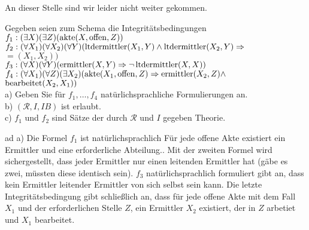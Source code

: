 \documentclass[12pt,a4paper]{amsart}
\begin{document}
An dieser Stelle sind wir leider nicht weiter gekommen.

\bigskip

\begin{aufgabe1}
Gegeben seien zum Schema die Integritätsbedingungen\\
$f_1:(\exists X)(\exists Z)(\operatorname{akte}(X,\operatorname{offen},Z))$\\
$f_2:(\forall X_1)(\forall X_2)(\forall Y)(\operatorname{ltdermittler}(X_1,Y)\land\operatorname{ltdermittler}(X_2,Y)\Rightarrow$\\ $=(X_1,X_2))$\\
$f_3:(\forall X)(\forall Y)(\operatorname{ermittler}(X,Y)\Rightarrow\lnot\operatorname{ltdermittler}(X,X))$\\
$f_4:(\forall X_1)(\forall Z)(\exists X_2)(\operatorname{akte}(X_1,\operatorname{offen},Z)\Rightarrow\operatorname{ermittler}(X_2,Z)\land$\\ $\operatorname{bearbeitet}(X_2,X_1))$\\
a) Geben Sie für $f_1,\dots,f_4$ natürlichsprachliche Formulierungen an.\\
b) $(\mathcal{R},I,IB)$ ist erlaubt.\\
c) $f_1$ und $f_2$ sind Sätze der durch $\mathcal{R}$ und $I$ gegeben Theorie.
\end{aufgabe1}

\medskip

ad a) Die Formel $f_1$ ist natürlichsprachlich \glqq Für jede offene Akte existiert ein Ermittler und eine erforderliche Abteilung.\grqq . Mit
der zweiten Formel wird sichergestellt, dass jeder Ermittler nur einen leitenden Ermittler hat (gäbe es zwei, müssten diese identisch sein). $f_3$
natürlichsprachlich formuliert gibt an, dass kein Ermittler leitender Ermittler von sich selbst sein kann. Die letzte Integritätsbedingung gibt
schließlich an, dass für jede offene Akte mit dem Fall $X_1$ und der erforderlichen Stelle $Z$, ein Ermittler $X_2$ existiert, der in $Z$ arbetiet und
$X_1$ bearbeitet.

\medskip
\end{document}
